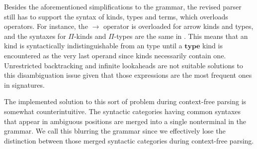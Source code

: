\clearpage

Besides the aforementioned simplifications to the grammar, the revised parser still has to support the syntax of \LF kinds, types and terms, which overloads operators.
For instance, the $\to$ operator is overloaded for arrow kinds and types, and the syntaxes for $\Pi$-kinds and $\Pi$-types are the same in \Beluga.
This means that an \LF kind is syntactically indistinguishable from an \LF type until a $\mathbf{type}$ kind is encountered as the very last operand since \LF kinds necessarily contain one.
Unrestricted backtracking and infinite lookaheads are not suitable solutions to this disambiguation issue given that those expressions are the most frequent ones in \Beluga signatures.

The implemented solution to this sort of problem during context-free parsing is somewhat counterintuitive.
The syntactic categories having common syntaxes that appear in ambiguous positions are merged into a single nonterminal in the grammar.
We call this blurring the grammar since we effectively lose the distinction between those merged syntactic categories during context-free parsing.

